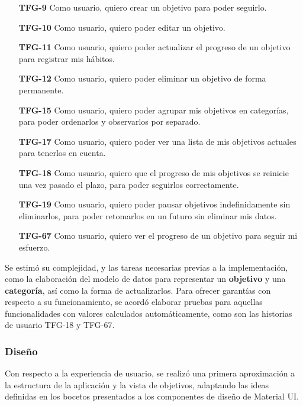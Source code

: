 \documentclass[10pt, a4paper]{aqademic}
\begin{document}
\begin{itemize}[leftmargin=16mm]
	\item [\textbf{TFG-9}] Como usuario, quiero crear un objetivo para poder seguirlo.
	
	\item [\textbf{TFG-10}] Como usuario, quiero poder editar un objetivo.
	
	\item [\textbf{TFG-11}] Como usuario, quiero poder actualizar el progreso de un objetivo para registrar mis hábitos.
	
	\item [\textbf{TFG-12}] Como usuario, quiero poder eliminar un objetivo de forma permanente.
	
	\item [\textbf{TFG-15}] Como usuario, quiero poder agrupar mis objetivos en categorías, para poder ordenarlos y observarlos por separado.
	
	\item [\textbf{TFG-17}] Como usuario, quiero poder ver una lista de mis objetivos actuales para tenerlos en cuenta.
	
	\item [\textbf{TFG-18}] Como usuario, quiero que el progreso de mis objetivos se reinicie una vez pasado el plazo, para poder seguirlos correctamente.
	
	
	\item [\textbf{TFG-19}] Como usuario, quiero poder pausar objetivos indefinidamente sin eliminarlos, para poder retomarlos en un futuro sin eliminar mis datos.
	
	\item [\textbf{TFG-67}] Como usuario, quiero ver el progreso de un objetivo para seguir mi esfuerzo.
\end{itemize}


Se estimó su complejidad, y las tareas necesarias previas a la implementación, como la elaboración del modelo de datos para representar un \textbf{objetivo} y una \textbf{categoría}, así como la forma de actualizarlos. Para ofrecer garantías con respecto a su funcionamiento, se acordó elaborar pruebas para aquellas funcionalidades con valores calculados automáticamente, como son las historias de usuario TFG-18 y TFG-67.


\subsubsection{Diseño}

Con respecto a la experiencia de usuario, se realizó una primera aproximación a la estructura de la aplicación y la vista de objetivos, adaptando las ideas definidas en los bocetos presentados a los componentes de diseño de Material UI. 
\end{document}
